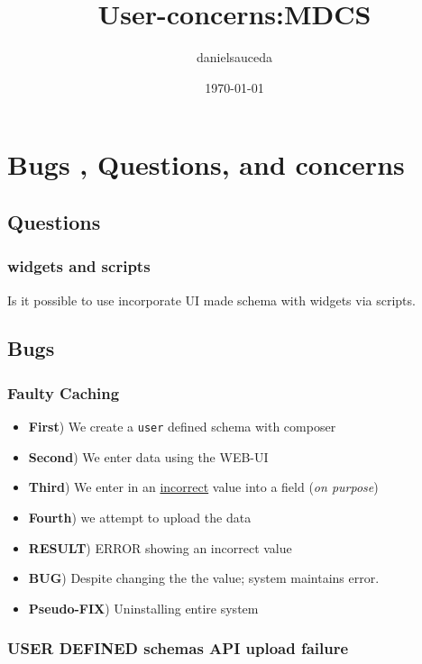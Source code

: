 \documentclass[11pt]{article}
\title{User-concerns:MDCS}
\author{danielsauceda}
\date{\today}
\begin{document}
\maketitle

\setcounter{tocdepth}{3}
\tableofcontents
\vspace*{1cm}


\section{Bugs , Questions, and concerns}
\label{sec-1}
\subsection{Questions}
\label{sec-1-1}
\subsubsection{widgets and scripts}
\label{sec-1-1-1}

Is it possible to use incorporate UI made schema with widgets via scripts.
\subsection{Bugs}
\label{sec-1-2}
\subsubsection{Faulty Caching}
\label{sec-1-2-1}

\begin{itemize}
\item \textbf{First}) We create a \verb~user~ defined schema with composer
\item \textbf{Second}) We enter data using the WEB-UI
\item \textbf{Third}) We enter in an \underline{incorrect} value into a field (\emph{on purpose})
\item \textbf{Fourth}) we attempt to upload the data
\item \textbf{RESULT}) ERROR showing an incorrect value
\item \textbf{BUG}) Despite changing the the value; system maintains error.
\item \textbf{Pseudo-FIX}) Uninstalling entire system
\end{itemize}
\subsubsection{USER DEFINED schemas API upload failure}
\label{sec-1-2-2}
\end{document}
